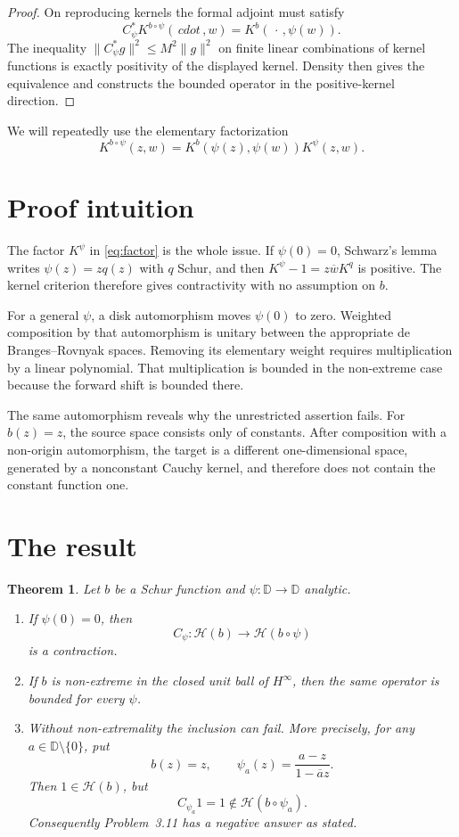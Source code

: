 \documentclass[11pt]{article}
\newtheorem{theorem}{Theorem}
\theoremstyle{remark}
\newcommand{\D}{\mathbb D}
\newcommand{\cH}{\mathcal H}
\begin{document}
\begin{proof}
On reproducing kernels the formal adjoint must satisfy
\[
  C_\psi^*K^{b\circ\psi}(\,cdot\,,w)
  =K^b(\,\cdot\,,\psi(w)).
\]
The inequality \(\|C_\psi^*g\|^2\le M^2\|g\|^2\) on finite linear
combinations of kernel functions is exactly positivity of the displayed
kernel. Density then gives the equivalence and constructs the bounded
operator in the positive-kernel direction.
\end{proof}

We will repeatedly use the elementary factorization
\begin{equation}
\label{eq:factor}
  K^{b\circ\psi}(z,w)
  =K^b(\psi(z),\psi(w))K^\psi(z,w).
\end{equation}

\section{Proof intuition}

The factor \(K^\psi\) in \eqref{eq:factor} is the whole issue. If
\(\psi(0)=0\), Schwarz's
lemma writes \(\psi(z)=zq(z)\) with \(q\) Schur, and then
\(K^\psi-1=z\overline w K^q\) is positive. The kernel criterion therefore
gives contractivity with no assumption on \(b\).

For a general \(\psi\), a disk automorphism moves \(\psi(0)\) to zero.
Weighted composition by that automorphism is unitary between the appropriate
de Branges--Rovnyak spaces. Removing its elementary weight requires
multiplication by a linear polynomial. That multiplication is bounded in the
non-extreme case because the forward shift is bounded there.

The same automorphism reveals why the unrestricted assertion fails. For
\(b(z)=z\), the source space consists only of constants. After composition
with a non-origin automorphism, the target is a different one-dimensional
space, generated by a nonconstant Cauchy kernel, and therefore does not
contain the constant function one.

\section{The result}

\begin{theorem}
\label{thm:main}
Let \(b\) be a Schur function and \(\psi:\D\to\D\) analytic.
\begin{enumerate}
\item If \(\psi(0)=0\), then
\[
  C_\psi:\cH(b)\longrightarrow\cH(b\circ\psi)
\]
is a contraction.
\item If \(b\) is non-extreme in the closed unit ball of \(H^\infty\), then
the same operator is bounded for every \(\psi\).
\item Without non-extremality the inclusion can fail. More precisely, for
any \(a\in\D\setminus\{0\}\), put
\[
  b(z)=z,
  \qquad
  \psi_a(z)=\frac{a-z}{1-\overline a z}.
\]
Then \(1\in\cH(b)\), but
\[
  C_{\psi_a}1=1\notin\cH(b\circ\psi_a).
\]
Consequently Problem~3.11 has a negative answer as stated.
\end{enumerate}
\end{theorem}
\end{document}
